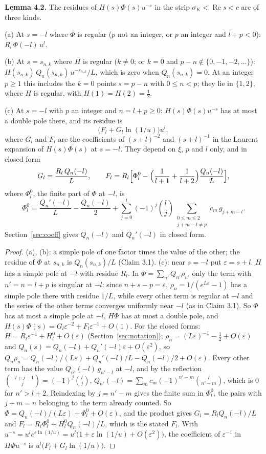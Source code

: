 \documentclass[11pt]{article}
\newcommand{\re}{\operatorname{Re}}
\begin{document}
\noindent\textbf{Lemma 4.2.} The residues of $H(s)\Phi(s)u^{-s}$ in the strip $\sigma_K<\re s<c$ are of three kinds.

(a) At $s=-l$ where $\Phi$ is regular ($p$ not an integer, or $p$ an integer and $l+p<0$): $R_l\,\Phi(-l)\,u^l$.

(b) At $s=s_{n,k}$ where $H$ is regular ($k\ne0$; or $k=0$ and $p-n\notin\{0,-1,-2,\dots\}$): $H(s_{n,k})\,Q_n(s_{n,k})\,u^{-s_{n,k}}/L$, which is zero when $Q_n(s_{n,k})=0$. At an integer $p\ge1$ this includes the $k=0$ points $s=p-n$ with $0\le n<p$; they lie in $\{1,2\}$, where $H$ is regular, with $H(1)=H(2)=\frac12$.

(c) At $s=-l$ with $p$ an integer and $n=l+p\ge0$: $H(s)\Phi(s)u^{-s}$ has at most a double pole there, and its residue is
\[
\bigl(F_l+G_l\ln(1/u)\bigr)u^l,
\]
where $G_l$ and $F_l$ are the coefficients of $(s+l)^{-2}$ and $(s+l)^{-1}$ in the Laurent expansion of $H(s)\Phi(s)$ at $s=-l$. They depend on $\xi$, $p$ and $l$ only, and in closed form
\[
G_l=\frac{R_l\,Q_n(-l)}{L},\qquad F_l=R_l\Bigl[\Phi^0_l-\Bigl(\frac1{l+1}+\frac1{l+2}\Bigr)\frac{Q_n(-l)}{L}\Bigr],
\]
where $\Phi^0_l$, the finite part of $\Phi$ at $-l$, is
\[
\Phi^0_l=\frac{Q_n'(-l)}{L}-\frac{Q_n(-l)}{2}+\sum_{j=0}^{l}(-1)^j\binom{l}{j}\sum_{\substack{0\le m\le2\\ j+m-l\ne p}}c_m\,g_{j+m-l}.
\]
Section~\ref{sec:coeff} gives $Q_n(-l)$ and $Q_n'(-l)$ in closed form.

\begin{proof}
(a), (b): a simple pole of one factor times the value of the other; the residue of $\Phi$ at $s_{n,k}$ is $Q_n(s_{n,k})/L$ (Claim 3.1). (c): near $s=-l$ put $\varepsilon=s+l$. $H$ has a simple pole at $-l$ with residue $R_l$. In $\Phi=\sum_{n'}Q_{n'}\rho_{n'}$ only the term with $n'=n=l+p$ is singular at $-l$: since $n+s-p=\varepsilon$, $\rho_n=1/(e^{L\varepsilon}-1)$ has a simple pole there with residue $1/L$, while every other term is regular at $-l$ and the series of the other terms converges uniformly near $-l$ (as in Claim 3.1). So $\Phi$ has at most a simple pole at $-l$, $H\Phi$ has at most a double pole, and $H(s)\Phi(s)=G_l\varepsilon^{-2}+F_l\varepsilon^{-1}+O(1)$. For the closed forms: $H=R_l\varepsilon^{-1}+H^0_l+O(\varepsilon)$ (Section~\ref{sec:notation}); $\rho_n=(L\varepsilon)^{-1}-\frac12+O(\varepsilon)$ and $Q_n(s)=Q_n(-l)+Q_n'(-l)\varepsilon+O(\varepsilon^2)$, so $Q_n\rho_n=Q_n(-l)/(L\varepsilon)+Q_n'(-l)/L-Q_n(-l)/2+O(\varepsilon)$. Every other term has the value $Q_{n'}(-l)\,g_{n'-l}$ at $-l$, and by the reflection $\binom{-l+j-1}{j}=(-1)^j\binom{l}{j}$, $Q_{n'}(-l)=\sum_mc_m(-1)^{n'-m}\binom{l}{n'-m}$, which is $0$ for $n'>l+2$. Reindexing by $j=n'-m$ gives the finite sum in $\Phi^0_l$, the pairs with $j+m=n$ belonging to the term already counted. So $\Phi=Q_n(-l)/(L\varepsilon)+\Phi^0_l+O(\varepsilon)$, and the product gives $G_l=R_lQ_n(-l)/L$ and $F_l=R_l\Phi^0_l+H^0_lQ_n(-l)/L$, which is the stated $F_l$. With $u^{-s}=u^le^{\varepsilon\ln(1/u)}=u^l\bigl(1+\varepsilon\ln(1/u)+O(\varepsilon^2)\bigr)$, the coefficient of $\varepsilon^{-1}$ in $H\Phi u^{-s}$ is $u^l\bigl(F_l+G_l\ln(1/u)\bigr)$.
\end{proof}
\end{document}
